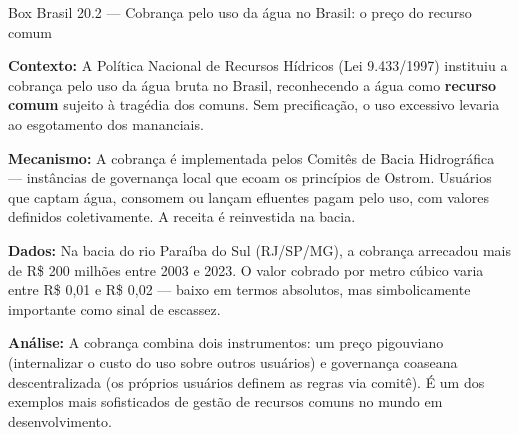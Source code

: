 \documentclass[11pt,twoside,openright]{book}
\begin{document}
\begin{boxbrasilbox}{Box Brasil 20.2 — Cobrança pelo uso da água no Brasil: o preço do recurso comum}

\textbf{Contexto:} A Política Nacional de Recursos Hídricos (Lei
9.433/1997) instituiu a cobrança pelo uso da água bruta no Brasil,
reconhecendo a água como \textbf{recurso comum} sujeito à tragédia dos
comuns. Sem precificação, o uso excessivo levaria ao esgotamento dos
mananciais.

\textbf{Mecanismo:} A cobrança é implementada pelos Comitês de Bacia
Hidrográfica --- instâncias de governança local que ecoam os princípios
de Ostrom. Usuários que captam água, consomem ou lançam efluentes pagam
pelo uso, com valores definidos coletivamente. A receita é reinvestida
na bacia.

\textbf{Dados:} Na bacia do rio Paraíba do Sul (RJ/SP/MG), a cobrança
arrecadou mais de R\$ 200 milhões entre 2003 e 2023. O valor cobrado por
metro cúbico varia entre R\$ 0,01 e R\$ 0,02 --- baixo em termos
absolutos, mas simbolicamente importante como sinal de escassez.

\textbf{Análise:} A cobrança combina dois instrumentos: um preço
pigouviano (internalizar o custo do uso sobre outros usuários) e
governança coaseana descentralizada (os próprios usuários definem as
regras via comitê). É um dos exemplos mais sofisticados de gestão de
recursos comuns no mundo em desenvolvimento.

\end{boxbrasilbox}
\end{document}
